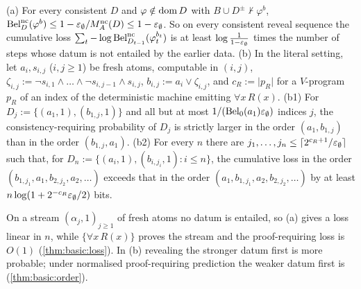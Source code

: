 \begin{proposition}\label{prop:basic:crorder}
(a) For every consistent $D$ and $\varphi\notin\operatorname{dom} D$ with $B\cup D^\pm\nvdash\varphi^b$, $\mathrm{Bel}^{\mathrm{nc}}_D(\varphi^b)\le1-\varepsilon_{\emptyset}/M_{A}^{\mathrm{nc}}(D)\le1-\varepsilon_{\emptyset}$. So on every consistent reveal sequence the cumulative loss $\sum_t-\log\mathrm{Bel}^{\mathrm{nc}}_{D_{t-1}}(\varphi_t^{b_t})$ is at least $\log\frac1{1-\varepsilon_{\emptyset}}$ times the number of steps whose datum is not entailed by the earlier data. (b) In the literal setting, let $a_i,s_{i,j}$ ($i,j\ge1$) be fresh atoms, computable in $(i,j)$, $\zeta_{i,j}:=\neg s_{i,1}\wedge\dots\wedge\neg s_{i,j-1}\wedge s_{i,j}$, $b_{i,j}:=a_i\vee\zeta_{i,j}$, and $c_R:=\lvert p_R\rvert$ for a $V$-program $p_R$ of an index of the deterministic machine emitting $\forall x\,R(x)$. (b1) For $D_j:=\{(a_1,1),(b_{1,j},1)\}$ and all but at most $1/(\mathrm{Bel}_0(a_1)\varepsilon_{\emptyset})$ indices $j$, the consistency-requiring probability of $D_j$ is strictly larger in the order $(a_1,b_{1,j})$ than in the order $(b_{1,j},a_1)$. (b2) For every $n$ there are $j_1,\dots,j_n\le\lceil2^{c_R+1}/\varepsilon_{\emptyset}\rceil$ such that, for $D_n:=\{(a_i,1),(b_{i,j_i},1):i\le n\}$, the cumulative loss in the order $(b_{1,j_1},a_1,b_{2,j_2},a_2,\dots)$ exceeds that in the order $(a_1,b_{1,j_1},a_2,b_{2,j_2},\dots)$ by at least $n\log(1+2^{-c_R}\varepsilon_{\emptyset}/2)$ bits.
\end{proposition}

On a stream $(\alpha_j,1)_{j\ge1}$ of fresh atoms no datum is entailed, so (a) gives a loss linear in $n$, while $\{\forall x\,R(x)\}$ proves the stream and the proof-requiring loss is $O(1)$ (\cref{thm:basic:loss}). In (b) revealing the stronger datum first is more probable; under normalised proof-requiring prediction the weaker datum first is (\cref{thm:basic:order}).


